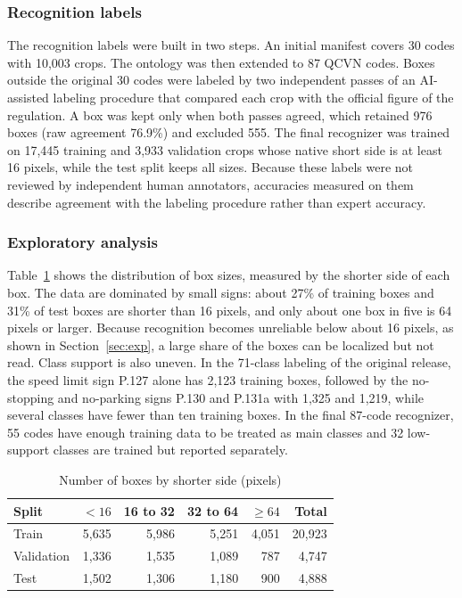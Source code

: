 \documentclass[conference,a4paper]{IEEEtran}
\begin{document}
\subsubsection{Recognition labels}

The recognition labels were built in two steps. An initial manifest covers 30 codes with 10,003 crops. The ontology was then extended to 87 QCVN codes. Boxes outside the original 30 codes were labeled by two independent passes of an AI-assisted labeling procedure that compared each crop with the official figure of the regulation. A box was kept only when both passes agreed, which retained 976 boxes (raw agreement 76.9\%) and excluded 555. The final recognizer was trained on 17,445 training and 3,933 validation crops whose native short side is at least 16 pixels, while the test split keeps all sizes. Because these labels were not reviewed by independent human annotators, accuracies measured on them describe agreement with the labeling procedure rather than expert accuracy.

\subsubsection{Exploratory analysis}

Table~\ref{tab:sizes} shows the distribution of box sizes, measured by the shorter side of each box. The data are dominated by small signs: about 27\% of training boxes and 31\% of test boxes are shorter than 16 pixels, and only about one box in five is 64 pixels or larger. Because recognition becomes unreliable below about 16 pixels, as shown in Section~\ref{sec:exp}, a large share of the boxes can be localized but not read. Class support is also uneven. In the 71-class labeling of the original release, the speed limit sign P.127 alone has 2,123 training boxes, followed by the no-stopping and no-parking signs P.130 and P.131a with 1,325 and 1,219, while several classes have fewer than ten training boxes. In the final 87-code recognizer, 55 codes have enough training data to be treated as main classes and 32 low-support classes are trained but reported separately.

\begin{table}[t]
\centering
\caption{Number of boxes by shorter side (pixels)}
\label{tab:sizes}
\begin{tabular}{lrrrrr}
\toprule
Split & $<16$ & 16 to 32 & 32 to 64 & $\geq 64$ & Total \\
\midrule
Train & 5,635 & 5,986 & 5,251 & 4,051 & 20,923 \\
Validation & 1,336 & 1,535 & 1,089 & 787 & 4,747 \\
Test & 1,502 & 1,306 & 1,180 & 900 & 4,888 \\
\bottomrule
\end{tabular}
\end{table}
\end{document}
